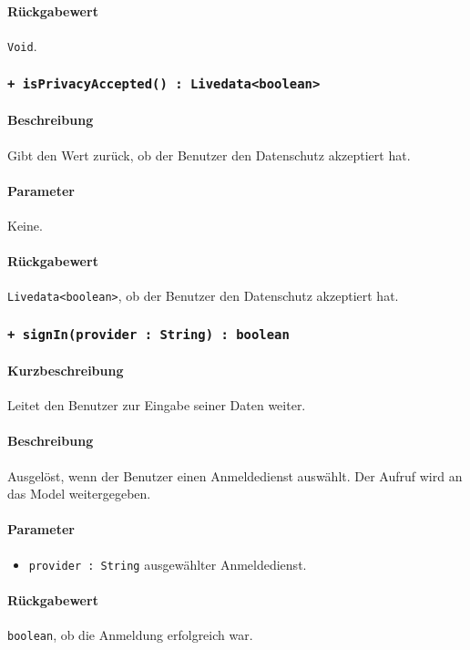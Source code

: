 \paragraph*{Rückgabewert}
\texttt{Void}.

\subsubsection*{\texttt{+ isPrivacyAccepted() : Livedata<boolean>}}\label{App_Signup_ISignInController_isPrivacyAccepted}%
\paragraph*{Beschreibung}
Gibt den Wert zurück, ob der Benutzer den Datenschutz akzeptiert hat.
\paragraph*{Parameter}
Keine.
\paragraph*{Rückgabewert}
\texttt{Livedata<boolean>}, ob der Benutzer den Datenschutz akzeptiert hat.

\subsubsection*{\texttt{+ signIn(provider : String) : boolean}}\label{App_Signup_ISignInController_signIn}%
\paragraph*{Kurzbeschreibung}
Leitet den Benutzer zur Eingabe seiner Daten weiter.
\paragraph*{Beschreibung}
Ausgelöst, wenn der Benutzer einen Anmeldedienst auswählt. 
Der Aufruf wird an das Model weitergegeben.
\paragraph*{Parameter}
\begin{itemize}
    \item \texttt{provider : String} ausgewählter Anmeldedienst.
\end{itemize}
\paragraph*{Rückgabewert}
\texttt{boolean}, ob die Anmeldung erfolgreich war.

